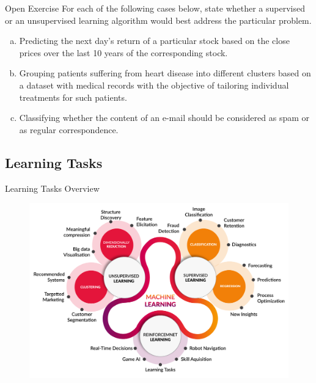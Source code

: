 \documentclass[main.tex]{subfiles}
\begin{document}
    \begin{frame}{Open Exercise }
        For each of the following cases below, state whether a supervised or an unsupervised learning algorithm would best address the particular problem.
        \begin{enumerate}[a)]
            \item Predicting the next day's return of a particular stock based on the close prices over the last 10 years of the corresponding stock.
            \item Grouping patients suffering from heart disease into different clusters based on a dataset with medical records with the objective of tailoring individual treatments for such patients.
            \item Classifying whether the content of an e-mail should be considered as spam or as regular correspondence.
        \end{enumerate}
    \end{frame}

    \subsection{Learning Tasks}
    
    \begin{frame}{Learning Tasks Overview}
        \begin{figure}
            \label{fig:learning-tasks}
            \includegraphics[width=.7\textwidth]{figures/external/learning-styles.png}
        \end{figure}
    \end{frame}
\end{document}
